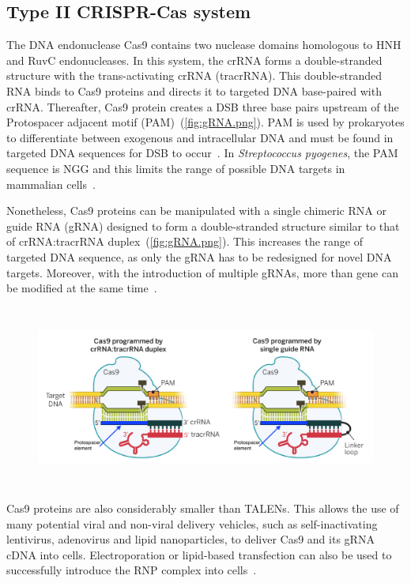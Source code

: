 \documentclass[11pt]{article}
\begin{document}
\subsection{Type II CRISPR-Cas system}
The DNA endonuclease Cas9 contains two nuclease domains homologous to HNH and RuvC endonucleases. In this system, the crRNA forms a double-stranded structure with the trans-activating crRNA (tracrRNA). This double-stranded RNA binds to Cas9 proteins and directs it to targeted DNA base-paired with crRNA. Thereafter, Cas9 protein creates a DSB three base pairs upstream of the Protospacer adjacent motif (PAM)~(\autoref{fig:gRNA.png}). PAM is used by prokaryotes to differentiate between exogenous and intracellular DNA and must be found in targeted DNA sequences for DSB to occur~\citep{Jinek2012a}. In \textit{Streptococcus pyogenes}, the PAM sequence is NGG and this limits the range of possible DNA targets in mammalian cells~\citep{Hou2013a}. 

Nonetheless, Cas9 proteins can be manipulated with a single chimeric RNA or guide RNA (gRNA) designed to form a double-stranded structure similar to that of crRNA:tracrRNA duplex~(\autoref{fig:gRNA.png}). This increases the range of targeted DNA sequence, as only the gRNA has to be redesigned for novel DNA targets. Moreover, with the introduction of multiple gRNAs, more than gene can be modified at the same time~\citep{Jinek2012a}.

\begin{figure}[H]
  \centering
    \includegraphics[width=\textwidth, height = 60mm]{gRNA.png}
    \label{fig:gRNA.png}
\end{figure}

Cas9 proteins are also considerably smaller than TALENs. This allows the use of many potential viral and non-viral delivery vehicles, such as self-inactivating lentivirus, adenovirus and lipid nanoparticles, to deliver Cas9 and its gRNA cDNA into cells. Electroporation or lipid-based transfection can also be used to successfully introduce the RNP complex into cells~\citep{Gori2015}.
\end{document}
